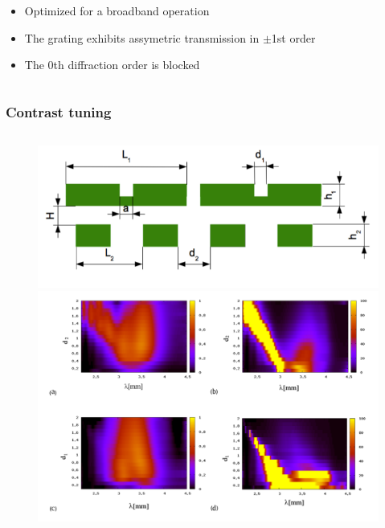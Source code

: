 \documentclass{beamer}
\begin{document}
\begin{frame}
\begin{columns}
\begin{column}{0.5\textwidth}
		\begin{itemize}
			\item Optimized for a broadband operation
			\item The grating exhibits assymetric transmission in  $\pm$1st order
			\item The 0th diffraction order is blocked
		\end{itemize}
		\end{column}

	\end{columns}
		
\end{frame}

\begin{frame}
	\frametitle{Contrast tuning}
	\begin{columns}
		\begin{column}{0.5\textwidth}
			\begin{figure}[htb]
				\includegraphics[width=\textwidth]{../images/dmg/kontrast_schemat.png}\\
				\includegraphics[width=\textwidth]{../images/dmg/kontrast_maps.png}\\

\end{figure}
\end{column}
\end{columns}
\end{frame}
\end{document}
